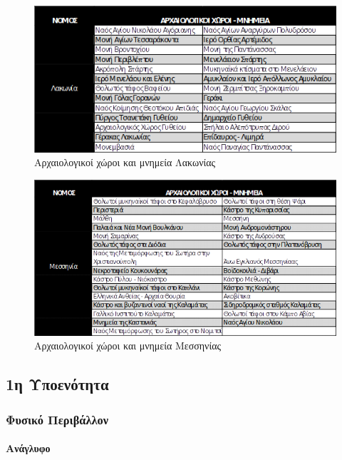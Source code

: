 \documentclass[12pt]{article}
\begin{document}
	\begin{figure} [H]
		\begin{center}
			\includegraphics [scale = 1.1] {lakonia3.png}
			\caption{Αρχαιολογικοί χώροι και μνημεία Λακωνίας}
		\end{center}
	\end{figure}

	\begin{figure} [H]
		\begin{center}
			\includegraphics [scale = 0.90] {messinia3.png}
			\caption{Αρχαιολογικοί χώροι και μνημεία Μεσσηνίας}
		\end{center}
	\end{figure}
	
	\subsection{1η Υποενότητα}
	\subsubsection{Φυσικό Περιβάλλον}
	
	\paragraph{Ανάγλυφο}
	
\end{document}
